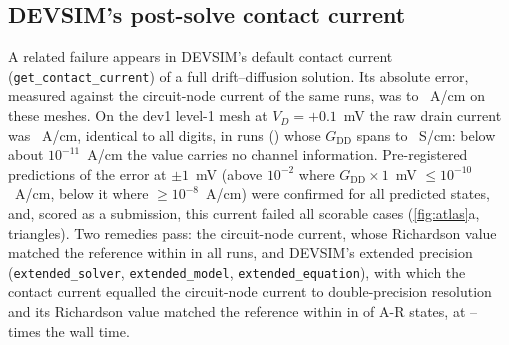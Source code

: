 \documentclass[11pt]{article}
\newcommand{\G}[1]{G_{\mathrm{#1}}}
\begin{document}
\subsection{DEVSIM's post-solve contact current}\label{sec:post}
A related failure appears in DEVSIM's default contact current (\texttt{get\_contact\_current}) of a full
drift--diffusion solution. Its absolute error, measured against the circuit-node current of the same runs, was
\floorMin{} to \floorMax{}~A/cm on these meshes. On the dev1 level-1 mesh at $V_D = +0.1$~mV the raw drain current was
\identValue{}~A/cm, identical to all digits, in \identN{} runs (\identStates) whose $\G{DD}$ spans \identGlo{} to
\identGhi{}~S/cm: below about $10^{-11}$~A/cm the value carries no channel information. Pre-registered predictions of
the error at $\pm1$~mV (above $10^{-2}$ where $\G{DD}\times1$~mV $\le 10^{-10}$~A/cm, below it where $\ge 10^{-8}$~A/cm)
were confirmed for all \pddConfirmed{} predicted states, and, scored as a submission, this current failed all
\hthreeAll{} scorable cases (\cref{fig:atlas}a, triangles). Two remedies pass: the circuit-node current, whose Richardson
value matched the reference within \ecircWorst{} in all runs, and DEVSIM's extended precision
(\texttt{extended\_solver}, \texttt{extended\_model}, \texttt{extended\_equation}), with which the contact current equalled
the circuit-node current to double-precision resolution and its Richardson value matched the reference within
\extMaxRich{} in \extPass{} of \extN{} A-R states, at \extCostMin{}--\extCostMax{} times the wall time.
\end{document}
